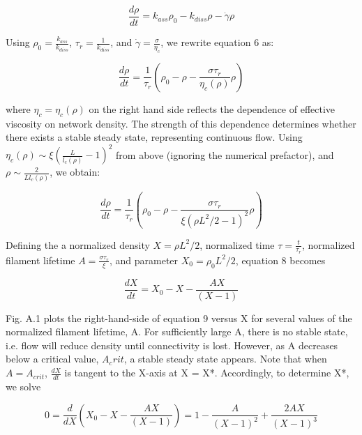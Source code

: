 \documentclass[10pt,letterpaper]{article}
\begin{document}
\begin{equation}
\label{drho_1}
\frac{d\rho}{dt}= k_{ass} \rho_0 - k_{diss} \rho - \dot{\gamma}\rho
\end{equation}



Using $\rho_0 = \frac{k_{ass}}{k_{diss}}$, $\tau_r=\frac{1}{k_{diss}}$, and $\dot{\gamma}=\frac{\sigma}{\eta_c}$, we rewrite equation 6 as:

\begin{equation}
\label{drho_2}
\frac{d\rho}{dt}=\frac{1}{\tau_r}\left ( \rho_0 - \rho - \frac{\sigma \tau_r}{\eta_c(\rho)} \rho\right )
\end{equation}

where $\eta_c = \eta_c(\rho)$ on the right hand side reflects the dependence of effective viscosity on network density.  The strength of this dependence determines whether there exists a stable steady state, representing continuous flow.  Using $\eta_c(\rho)\sim \xi \left ( \frac{L}{l_c(\rho)} -1 \right )^2$ from above (ignoring the numerical prefactor), and $\rho \sim \frac{2}{L l_c(\rho)}$, we obtain:


\begin{equation}
\label{drho_3}
\frac{d\rho}{dt}=\frac{1}{\tau_r}\left ( \rho_0 - \rho - \frac{\sigma \tau_r}{\xi(\rho L^2/2 -1)^2}\rho\right )
\end{equation}

Defining the a normalized density $X=\rho L^2/2$, normalized time $\tau = \frac{t}{\tau_r}$, normalized filament lifetime $A=\frac{\sigma \tau_r}{\xi}$, and parameter $X_0=\rho_0 L^2/2$, equation 8 becomes

\begin{equation}
\label{drho_4}
\frac{dX}{dt}=X_0 - X - \frac{AX}{\left (X - 1\right )} 
\end{equation}

Fig. A.1 plots the right-hand-side of equation 9 versus X for several values of the normalized filament lifetime, A.  For sufficiently large A, there is no stable state, i.e. flow will reduce density until connectivity is lost. However, as A decreases below a critical value, $A_crit$, a stable steady state appears. Note that when $A=A_{crit}$, $\frac{dX}{dt}$ is tangent to the X-axis at X = X*. Accordingly, to determine X*, we solve


\begin{equation}
\label{drho_5}
0 = \frac{d}{dX} \left (X_0 - X - \frac{AX}{\left (X - 1\right )}\right ) = 1 - \frac{A}{\left(X - 1 \right )^2 } + \frac{2AX}{\left (X - 1\right )^3}
\end{equation}
\end{document}
